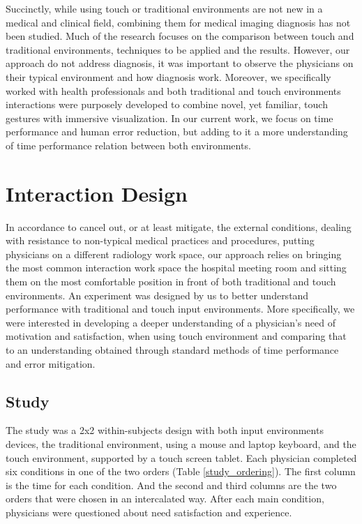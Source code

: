 \documentclass{sigchi}
\begin{document}
Succinctly, while using touch or traditional environments are not new in a medical and clinical field, combining them for medical imaging diagnosis has not been studied. Much of the research focuses on the comparison between touch and traditional environments, techniques to be applied and the results. However, our approach do not address diagnosis, it was important to observe the physicians on their typical environment and how diagnosis work. Moreover, we specifically worked with health professionals and both traditional and touch environments interactions were purposely developed to combine novel, yet familiar, touch gestures with immersive visualization. In our current work, we focus on time performance and human error reduction, but adding to it a more understanding of time performance relation between both environments.

\section{Interaction Design}

In accordance to cancel out, or at least mitigate, the external conditions, dealing with resistance to non-typical medical practices and procedures, putting physicians on a different radiology work space, our approach relies on bringing the most common interaction work space the hospital meeting room and sitting them on the most comfortable position in front of both traditional and touch environments. An experiment was designed by us to better understand performance with traditional and touch input environments. More specifically, we were interested in developing a deeper understanding of a physician's need of motivation and satisfaction, when using touch environment and comparing that to an understanding obtained through standard methods of time performance and error mitigation.

\subsection{Study}

The study was a 2x2 within-subjects design with both input environments devices, the traditional environment, using a mouse and laptop keyboard, and the touch environment, supported by a touch screen tablet. Each physician completed six conditions in one of the two orders (Table \ref{study_ordering}). The first column is the time for each condition. And the second and third columns are the two orders that were chosen in an intercalated way. After each main condition, physicians were questioned about need satisfaction and experience.
\end{document}

